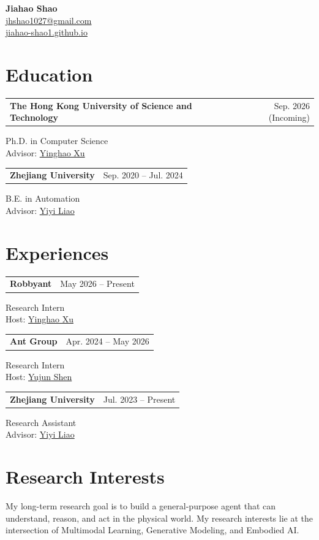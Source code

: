 \documentclass[11pt]{article}
\makeatletter
\newcommand{\cventry}[2]{%
  \noindent\begin{tabularx}{\textwidth}{@{}X r@{}}
    \textbf{#1} & #2
  \end{tabularx}\par%
}
\makeatother
\begin{document}
{\huge\bfseries Jiahao Shao}\\[4pt]
\href{mailto:jhshao1027@gmail.com}{jhshao1027@gmail.com}\\
\href{https://jiahao-shao1.github.io}{jiahao-shao1.github.io}

\section*{Education}

\cventry{The Hong Kong University of Science and Technology}{Sep. 2026 (Incoming)}
Ph.D. in Computer Science\\
Advisor: \href{https://justimyhxu.github.io/}{Yinghao Xu}

\vspace{6pt}

\cventry{Zhejiang University}{Sep. 2020 -- Jul. 2024}
B.E. in Automation\\
Advisor: \href{https://yiyiliao.github.io/}{Yiyi Liao}

\section*{Experiences}

\cventry{Robbyant}{May 2026 -- Present}
Research Intern\\
Host: \href{https://justimyhxu.github.io/}{Yinghao Xu}

\vspace{6pt}

\cventry{Ant Group}{Apr. 2024 -- May 2026}
Research Intern\\
Host: \href{https://shenyujun.github.io/}{Yujun Shen}

\vspace{6pt}

\cventry{Zhejiang University}{Jul. 2023 -- Present}
Research Assistant\\
Advisor: \href{https://yiyiliao.github.io/}{Yiyi Liao}

\section*{Research Interests}

My long-term research goal is to build a general-purpose agent that can understand, reason, and act in the physical world. My research interests lie at the intersection of Multimodal Learning, Generative Modeling, and Embodied AI.
\end{document}
